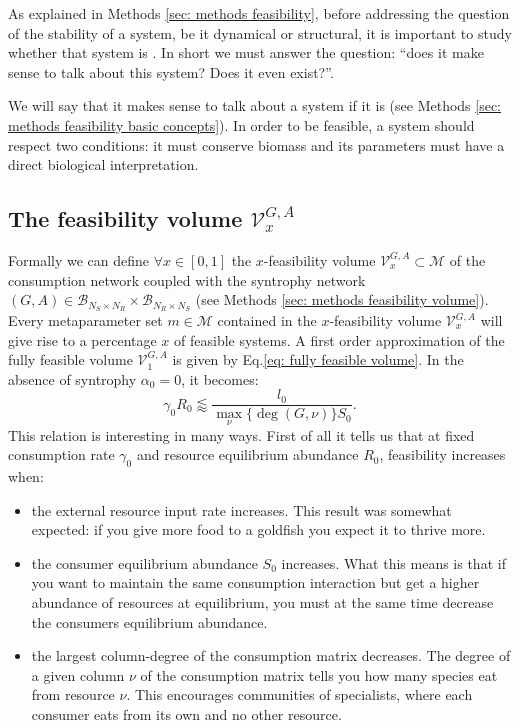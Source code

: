 \documentclass[12pt, titlepage]{report}
\begin{document}
As explained in Methods \ref{sec: methods feasibility}, before addressing the question of the stability of a system, be it dynamical or structural, it is important to study whether that system is . In short we must answer the question: ``does it make sense to talk about this system? Does it even exist?''.

We will say that it makes sense to talk about a system if it is  (see Methods \ref{sec: methods feasibility basic concepts}). In order to be feasible, a system should respect two conditions: it must conserve biomass and its parameters must have a direct biological interpretation.

\subsection{The feasibility volume $\mathcal{V}^{G,A}_x$}
Formally we can define $\forall x \in [0,1]$ the $x$-feasibility volume $\mathcal{V}^{G,A}_x \subset \mathcal{M}$ of the consumption network coupled with the syntrophy network $(G, A) \in \mathcal{B}_{N_S \times N_R} \times  \mathcal{B}_{N_R \times N_S}$ (see Methods \ref{sec: methods feasibility volume}). Every metaparameter set $m \in \mathcal{M}$ contained in the $x$-feasibility volume $\mathcal{V}^{G,A}_x$ will give rise to a percentage $x$ of feasible systems. A first order approximation of the fully feasible volume $\mathcal{V}^{G,A}_1$ is given by Eq.\eqref{eq: fully feasible volume}.
In the absence of syntrophy $\alpha_0=0$, it becomes:
\begin{equation}
\gamma_0 R_0 \lessapprox \frac{l_0}{\max_\nu\{\deg(G,\nu)\}S_0}. \label{eq: fully feasible volume no syntrophy}
\end{equation}
This relation is interesting in many ways. First of all it tells us that at fixed consumption rate $\gamma_0$ and resource equilibrium abundance $R_0$, feasibility increases when:
\begin{itemize}
\item the external resource input rate increases. This result was somewhat expected: if you give more food to a goldfish you expect it to thrive more.
\item the consumer equilibrium abundance $S_0$ increases. What this means is that if you want to maintain the same consumption interaction but get a higher abundance of resources at equilibrium, you must at the same time decrease the consumers equilibrium abundance.
\item the largest column-degree of the consumption matrix decreases. The degree of a given column $\nu$ of the consumption matrix tells you how many species eat from resource $\nu$. This encourages communities of specialists, where each consumer eats from its own and no other resource.
\end{itemize}
\end{document}
